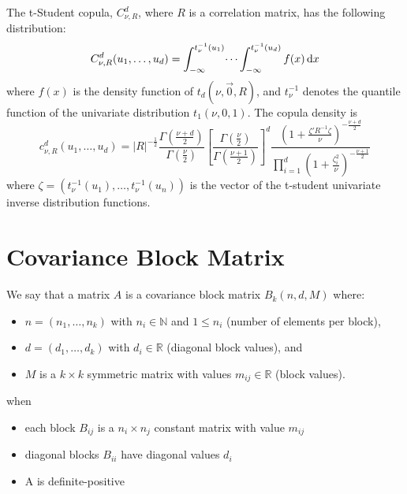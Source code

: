 \documentclass[11pt,fleqn]{book} %
\begin{document}
\begin{proposition}
	The t-Student copula, $C_{\nu,R}^d$, where $R$ is a correlation matrix,
	has the following distribution:
	\begin{displaymath}
		C_{\nu,R}^d(u_1, \dots, u_d) = 
		\int_{-\infty}^{t_\nu^{-1}(u_1)} \dots \int_{-\infty}^{t_\nu^{-1}(u_d)} f(x) \mathop{\mathrm{{}d}}\mathopen{} x
	\end{displaymath}
	where $f(x)$ is the density function of $t_d(\nu,\vec{0},R)$, and $t_{\nu}^{-1}$ 
	denotes the quantile function of the univariate distribution $t_1(\nu,0,1)$. 
	The copula density is
	\begin{displaymath}
		\label{eq:density}
		c_{\nu,R}^d(u_1,\dots,u_d) =
		|R|^{-\frac{1}{2}} 
		\displaystyle\frac{\Gamma{\left(\frac{\nu+d}{2}\right)}}{\Gamma{\left(\frac{\nu}{2}\right)}}
		\displaystyle\left[ \frac{\Gamma{\left(\frac{\nu}{2}\right)}}{\Gamma{\left(\frac{\nu+1}{2}\right)}} \right]^d
		\frac{\displaystyle\left( 1+\frac{\zeta' R^{-1} \zeta}{\nu}\right)^{-\frac{\nu+d}{2}}}{\displaystyle\prod_{i=1}^d \left( 1+\frac{\zeta_i^2}{\nu} \right)^{-\frac{\nu+1}{2}}}
	\end{displaymath}
	\noindent
	where $\zeta=(t_\nu^{-1}(u_1), \dots, t_\nu^{-1}(u_n))$ is the vector of 
	the t-student univariate inverse distribution functions.
\end{proposition}

\section{Covariance Block Matrix}
\label{ap:cbm}

\begin{definition}
	We say that a matrix $A$ is a covariance block matrix $B_k(n,d,M)$ where:
	\begin{itemize}
		\item $n=(n_1,\dots,n_k)$ with $n_i \in \mathbb{N}$ and $1 \le n_i$ (number of elements per block),
		\item $d=(d_1,\dots,d_k)$ with $d_i \in \mathbb{R}$ (diagonal block values), and
		\item $M$ is a $k {\times} k$ symmetric matrix with values $m_{ij} \in \mathbb{R}$ (block values).
	\end{itemize}
	when
	\begin{itemize}
		\item each block $B_{ij}$ is a $n_i {\times} n_j$ constant matrix with value $m_{ij}$
		\item diagonal blocks $B_{ii}$ have diagonal values $d_i$
		\item A is definite-positive
	\end{itemize}
\end{definition}
\end{document}

